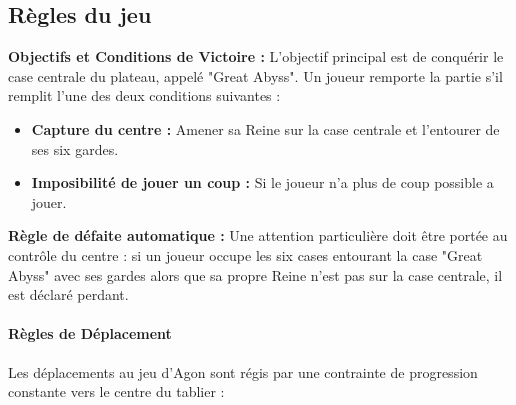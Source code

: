 \documentclass[10pt]{article} %
\begin{document}
\subsection{Règles du jeu}
\textbf{Objectifs et Conditions de Victoire :} 
L'objectif principal est de conquérir le case centrale du plateau, appelé "Great Abyss". Un joueur remporte la partie s'il remplit l'une des deux conditions suivantes :

\bigskip

\begin{itemize}
    \item[$\bullet$] \textbf{Capture du centre :} Amener sa Reine sur la case centrale et l'entourer de ses six gardes. 
    
    \bigskip
    
    \item[$\bullet$] \textbf{Imposibilité de jouer un coup :} Si le joueur n'a plus de coup possible a jouer.
    
\end{itemize}

\bigskip
\textbf{Règle de défaite automatique :} 
Une attention particulière doit être portée au contrôle du centre : si un joueur occupe les six cases entourant la case "Great Abyss" avec ses gardes alors que sa propre Reine n'est pas sur la case centrale, il est déclaré perdant.
\medskip

\paragraph{\indent \textbf{Règles de Déplacement}} Les déplacements au jeu d'Agon sont régis par une contrainte de progression constante vers le centre du tablier :

\bigskip
\end{document}

